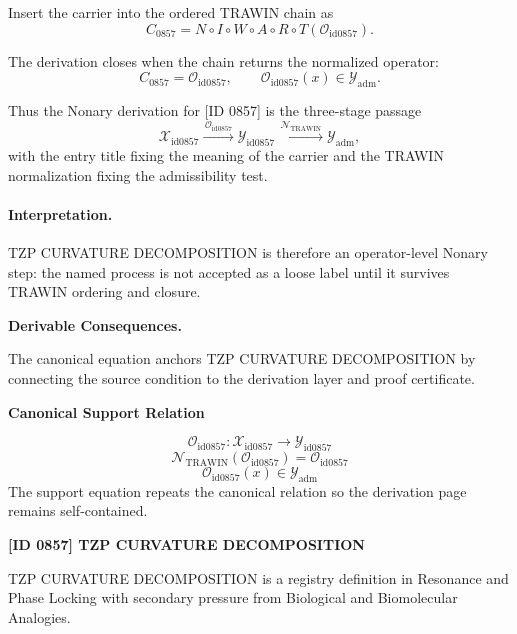 Insert the carrier into the ordered TRAWIN chain as\[
C_{0857}=N\circ I\circ W\circ A\circ R\circ T(\mathcal{O}_{\mathrm{id0857}}).
\]

The derivation closes when the chain returns the normalized operator:\[
C_{0857}=\mathcal{O}_{\mathrm{id0857}},\qquad \mathcal{O}_{\mathrm{id0857}}(x)\in\mathcal{Y}_{\mathrm{adm}}.
\]

Thus the Nonary derivation for [ID 0857] is the three-stage passage
\[
\mathcal{X}_{\mathrm{id0857}}\xrightarrow{\,\mathcal{O}_{\mathrm{id0857}}\,} \mathcal{Y}_{\mathrm{id0857}}\xrightarrow{\,\mathcal{N}_{\mathrm{TRAWIN}}\,} \mathcal{Y}_{\mathrm{adm}},
\]
with the entry title fixing the meaning of the carrier and the TRAWIN normalization fixing the admissibility test.

\paragraph{Interpretation.} TZP CURVATURE DECOMPOSITION is therefore an operator-level Nonary step: the named process is not accepted as a loose label until it survives TRAWIN ordering and closure.

\par\vspace{0.35em}
\noindent\textbf{Derivable Consequences.}\quad
\begingroup
\footnotesize
\raggedright
The canonical equation anchors TZP CURVATURE DECOMPOSITION by connecting the source condition to the derivation layer and proof certificate.
\par\endgroup

\noindent\textbf{Canonical Support Relation}\par
\[
\mathcal{O}_{\mathrm{id0857}}:\mathcal{X}_{\mathrm{id0857}}\longrightarrow\mathcal{Y}_{\mathrm{id0857}}
\]
\[
\mathcal{N}_{\mathrm{TRAWIN}}(\mathcal{O}_{\mathrm{id0857}})=\mathcal{O}_{\mathrm{id0857}}
\]
\[
\mathcal{O}_{\mathrm{id0857}}(x)\in\mathcal{Y}_{\mathrm{adm}}
\]
\noindent The support equation repeats the canonical relation so the derivation page remains self-contained.\par

\clearpage
\noindent\textbf{[ID 0857] TZP CURVATURE DECOMPOSITION}\par
\vspace{0.35em}
\begingroup\small
{}
TZP CURVATURE DECOMPOSITION is a registry definition in Resonance and Phase Locking with secondary pressure from Biological and Biomolecular Analogies.

